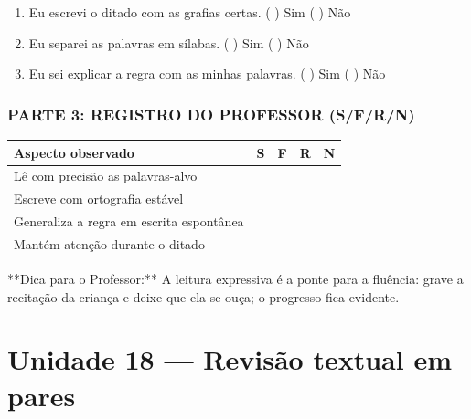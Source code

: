 \begin{exercicio}
\begin{enumerate}[label=\alph*)]
  \item Eu escrevi o ditado com as grafias certas.  \quad ( ) Sim   ( ) Não

  \item Eu separei as palavras em sílabas.  \quad ( ) Sim   ( ) Não

  \item Eu sei explicar a regra com as minhas palavras.  \quad ( ) Sim   ( ) Não

\end{enumerate}

\subsection*{PARTE 3: REGISTRO DO PROFESSOR (S/F/R/N)}

\begin{center}
\renewcommand{\arraystretch}{1.4}
\begin{tabular}{@{}p{9cm}cccc@{}}
\toprule
Aspecto observado & S & F & R & N \\
\midrule
Lê com precisão as palavras-alvo & & & & \\
Escreve com ortografia estável & & & & \\
Generaliza a regra em escrita espontânea & & & & \\
Mantém atenção durante o ditado & & & & \\
\bottomrule\end{tabular}\end{center}

\end{exercicio}

\begin{dica}
**Dica para o Professor:** A leitura expressiva é a ponte para a fluência: grave a recitação da criança e deixe que ela se ouça; o progresso fica evidente.
\end{dica}


\chapter{Unidade 18 --- Revisão textual em pares}


